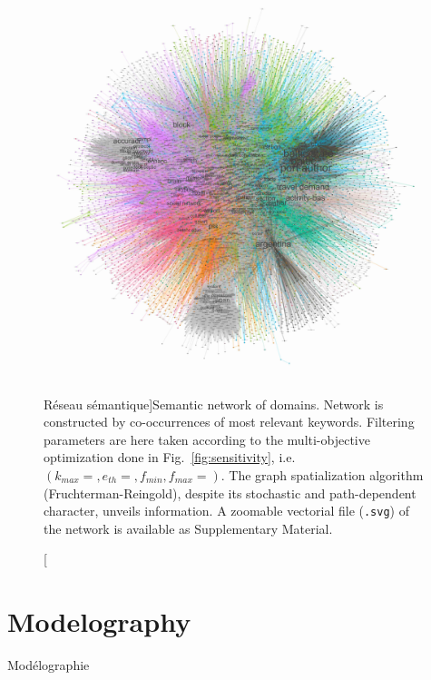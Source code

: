


\begin{figure}
\includegraphics[width=\linewidth]{Figures/Quantepistemo/semantic}
\caption[Semantic network ][Réseau sémantique]{Semantic network of domains. Network is constructed by co-occurrences of most relevant keywords. Filtering parameters are here taken according to the multi-objective optimization done in Fig.~\ref{fig:sensitivity}, i.e. $(k_{max}=,e_{th}=,f_{min},f_{max}=)$. The graph spatialization algorithm (Fruchterman-Reingold), despite its stochastic and path-dependent character, unveils information. A zoomable vectorial file (\texttt{.svg}) of the network is available as Supplementary Material.}{}
\label{fig:quantepistemo:semanticnw}
\end{figure}





\stars






\newpage

\section{Modelography}{Modélographie}

